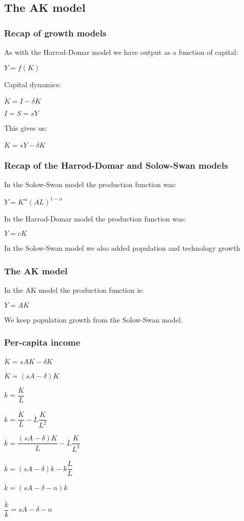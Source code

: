 
\subsection{The AK model}

\subsubsection{Recap of growth models}

As with the Harrod-Domar model we have output as a function of capital:

\(Y=f(K)\)

Capital dynamics:

\(\dot K=I-\delta K\)

\(I=S=sY\)

This gives us:

\(\dot K = sY-\delta K\)

\subsubsection{Recap of the Harrod-Domar and Solow-Swan models}

In the Solow-Swan model the production function was:

\(Y=K^\alpha (AL)^{1-\alpha }\)

In the Harrod-Domar model the production function was:

\(Y=cK\)

In the Solow-Swan model we also added population and technology growth

\subsubsection{The AK model}

In the AK model the production function is:

\(Y=AK\)

We keep population growth from the Solow-Swan model.

\subsubsection{Per-capita income}

\(\dot K = sAK-\delta K\)

\(\dot K = (sA-\delta )K\)

\(k=\dfrac{K}{L}\)

\(\dot k =\dfrac{\dot K}{L}-\dot L\dfrac{K}{L^2}\)

\(\dot k =\dfrac{(sA-\delta )K}{L}-\dot L\dfrac{K}{L^2}\)

\(\dot k =(sA-\delta )k-k\dfrac{\dot L}{L}\)

\(\dot k =(sA-\delta -n)k\)

\(\dfrac{\dot k}{k} =sA-\delta -n\)

